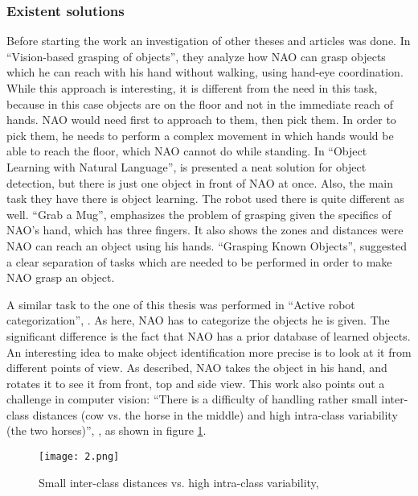     \subsubsection{Existent solutions}
        Before starting the work an investigation of other theses and articles was done. In ``Vision-based grasping of objects'', \cite{visualGrasping} they analyze how NAO can grasp objects which he can reach with his hand without walking, using hand-eye coordination. While this approach is interesting, it is different from the need in this task, because in this case objects are on the floor and not in the immediate reach of hands. NAO would need first to approach to them, then pick them. In order to pick them, he needs to perform a complex movement in which hands would be able to reach the floor, which NAO cannot do while standing. In ``Object Learning with Natural Language'', \cite{objectLearning} is presented a neat solution for object detection, but there is just one object in front of NAO at once. Also, the main task they have there is object learning. The robot used there is quite different as well. ``Grab a Mug'', \cite{grabAMug} emphasizes the problem of grasping given the specifics of NAO’s hand, which has three fingers. It also shows the zones and distances were NAO can reach an object using his hands. ``Grasping Known Objects'', \cite{graspingKnownObjects} suggested a clear separation of tasks which are needed to be performed in order to make NAO grasp an object. 

        A similar task to the one of this thesis was performed in ``Active robot categorization'', \cite{categorization}. As here, NAO has to categorize the objects he is given. The significant difference is the fact that NAO has a prior database of learned objects. An interesting idea to make object identification more precise is to look at it from different points of view. As described, NAO takes the object in his hand, and rotates it to see it from front, top and side view. This work also points out a challenge in computer vision: ``There is a difficulty of handling rather small inter-class distances (cow vs. the horse in the middle) and high intra-class variability (the two horses)'', \cite{categorization}, as shown in figure \ref{horses}.
    \begin{figure}[ht!]
         \texttt{[image: 2.png]} 
        \centering
        \caption{Small inter-class distances vs. high intra-class variability, \cite{categorization}}
        \label{horses}
    \end{figure}

